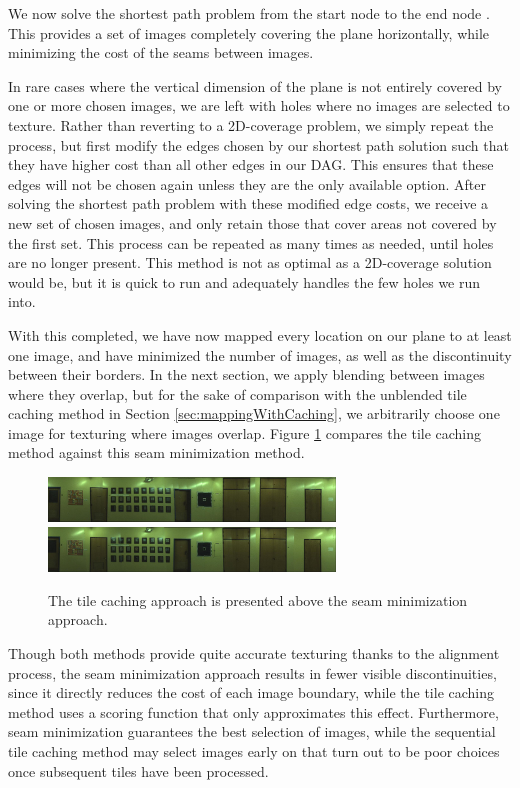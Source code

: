 \documentclass[10pt,twocolumn,letterpaper]{article}
\begin{document}
We now solve the shortest path problem from the start node to the end
node \cite{dijkstra}. This provides a set of images completely
covering the plane horizontally, while minimizing the cost of the
seams between images.

In rare cases where the vertical dimension of the plane is not
entirely covered by one or more chosen images, we are left with holes where no
images are selected to texture. Rather than reverting to a 2D-coverage problem, we simply repeat the process, but first modify the edges chosen by our shortest path solution such that they have higher cost than all other edges in our DAG. This ensures that these edges will not be chosen again unless they are the only available option. After solving the shortest path problem with these modified edge costs, we receive a new set of chosen images, and only retain those that cover areas not covered by the first set. This process can be repeated as many times as needed, until holes are no longer present. This method is not as optimal as a 2D-coverage solution would be, but it is quick to run and adequately handles the few holes we run into.

With this completed, we have now mapped every location on our plane to
at least one image, and have minimized the number of images, as well
as the discontinuity between their borders. In the next section, we
apply blending between images where they overlap, but for the sake of
comparison with the unblended tile caching method in Section
\ref{sec:mappingWithCaching}, we arbitrarily choose one image for
texturing where images overlap. Figure \ref{fig:compare_unblended}
compares the tile caching method against this seam minimization
method.

\begin{figure}
  \centering
  \includegraphics[width=3in]{wall1_cache_full_shifted.jpg}
  \includegraphics[width=3in]{wall1_dynprog_noblend.jpg}
  \caption{The tile caching approach is presented above the seam
    minimization approach.}
  \label{fig:compare_unblended}
\end{figure}


Though both methods provide quite accurate texturing thanks to the
alignment process, the seam minimization approach results in fewer
visible discontinuities, since it directly reduces the cost of each
image boundary, while the tile caching method uses a scoring function
that only approximates this effect. Furthermore, seam minimization
guarantees the best selection of images, while the sequential tile
caching method may select images early on that turn out to be poor
choices once subsequent tiles have been processed.
\end{document}
